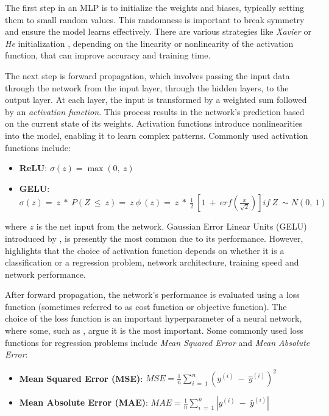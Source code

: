\documentclass[12pt,a4paper]{article}
\begin{document}
The first step in an MLP is to initialize the weights and biases, typically setting them to small random values. This randomness is important to break symmetry and ensure the model learns effectively. There are various strategies like \textit{Xavier} \parencite{glorot2010} or \textit{He} initialization \parencite{He_2015}, depending on the linearity or nonlinearity of the activation function, that can improve accuracy and training time.

The next step is forward propagation, which involves passing the input data through the network from the input layer, through the hidden layers, to the output layer. At each layer, the input is transformed by a weighted sum followed by an \textit{activation function}. This process results in the network's prediction based on the current state of its weights. Activation functions introduce nonlinearities into the model, enabling it to learn complex patterns. Commonly used activation functions include:

\begin{itemize}
  \item \textbf{ReLU}: $\sigma\left(z\right)=\max{\left(0,\ z\right)}$
  \item \textbf{GELU}: $\sigma\left(z\right)=\ z\ \ast\ P\left(Z\ \le\ z\right)=\ z\ \phi\ \left(z\right)=\ z\ \ast\ \frac{1}{2}\ \left[1\ +\ erf\left(\frac{x}{\sqrt2}\right)\right]
  if\ Z\ \sim N(0,\ 1)$
\end{itemize}

where $z$ is the net input from the network. Gaussian Error Linear Units (GELU) introduced by \cite{Hendrycks2016}, is presently the most common due to its performance. However, \cite{Raschka2017} highlights that the choice of activation function depends on whether it is a classification or a regression problem, network architecture, training speed and network performance.

After forward propagation, the network's performance is evaluated using a loss function (sometimes referred to as cost function or objective function). The choice of the loss function is an important hyperparameter of a neural network, where some, such as \cite{drager2022evaluating}, argue it is the most important. Some commonly used loss functions for regression problems include \textit{Mean Squared Error} and \textit{Mean Absolute Error}: 

\begin{itemize}
  \item \textbf{Mean Squared Error (MSE)}: $MSE=\frac{1}{n}\sum_{i\ =\ 1}^{n}\left(y^{\left(i\right)}\ -\ {\hat{y}}^{\left(i\right)}\right)^2$
  \item \textbf{Mean Absolute Error (MAE)}: $MAE=\frac{1}{n}\sum_{i\ =\ 1}^{n}\left|y^{\left(i\right)}\ -\ {\hat{y}}^{\left(i\right)}\right|$
\end{itemize}
\end{document}
